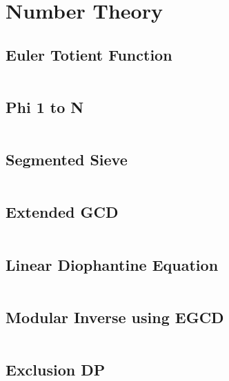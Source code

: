 \section{Number Theory}
\subsection{\small Euler Totient Function  \scriptsize}
\inputminted[breaklines, breakanywhere]{c++}{code/03-Number Theory/01-Euler Totient Function.cpp}

\subsection{\small Phi 1 to N  \scriptsize}
\inputminted[breaklines, breakanywhere]{c++}{code/03-Number Theory/02-Phi 1 to N.cpp}

\subsection{\small Segmented Sieve  \scriptsize}
\inputminted[breaklines, breakanywhere]{c++}{code/03-Number Theory/03-Segmented Sieve.cpp}

\subsection{\small Extended GCD  \scriptsize}
\inputminted[breaklines, breakanywhere]{c++}{code/03-Number Theory/04-Extended GCD.cpp}

\subsection{\small Linear Diophantine Equation  \scriptsize}
\inputminted[breaklines, breakanywhere]{c++}{code/03-Number Theory/05-Linear Diophantine Equation.cpp}

\subsection{\small Modular Inverse using EGCD  \scriptsize}
\inputminted[breaklines, breakanywhere]{c++}{code/03-Number Theory/06-Modular Inverse using EGCD.cpp}

\subsection{\small Exclusion DP  \scriptsize}
\inputminted[breaklines, breakanywhere]{c++}{code/03-Number Theory/07-Exclusion DP.cpp}

